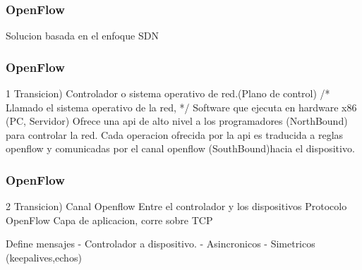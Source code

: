 \documentclass{beamer}
\begin{document}
%
%
%
%
%
%
%
%
%
%
%
%
%
%
%
%
%



\begin{frame}
\frametitle{OpenFlow} 
Solucion basada en el enfoque SDN


\end{frame}

\begin{frame}
\frametitle{OpenFlow} 
1 Transicion) Controlador o sistema operativo de red.(Plano de control) 
/*
Llamado el sistema operativo de la red, 
*/
Software que ejecuta en hardware x86 (PC, Servidor)
Ofrece una api de alto nivel a los programadores (NorthBound) para controlar la red.
Cada operacion ofrecida por la api es traducida a reglas openflow y comunicadas por el canal openflow (SouthBound)hacia el dispositivo.
\end{frame}

\begin{frame}
\frametitle{OpenFlow} 

2 Transicion) Canal Openflow 
Entre el controlador y los dispositivos
Protocolo OpenFlow
Capa de aplicacion, corre sobre TCP

Define mensajes
- Controlador a dispositivo. 
- Asincronicos
- Simetricos (keepalives,echos)

\end{frame}
\end{document}
